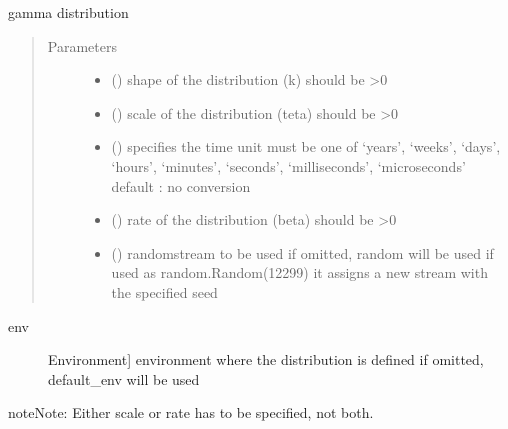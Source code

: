 \documentclass[letterpaper,10pt,english]{sphinxmanual}
\begin{document}
\begin{fulllineitems}
\label{\detokenize{Reference:salabim.Gamma}}
gamma distribution
\begin{quote}\begin{description}
\item[{Parameters}] \leavevmode\begin{itemize}
\item {} 
 () \textendash{} shape of the distribution (k) 
should be \textgreater{}0

\item {} 
 () \textendash{} scale of the distribution (teta) 
should be \textgreater{}0

\item {} 
 () \textendash{} specifies the time unit 
must be one of ‘years’, ‘weeks’, ‘days’, ‘hours’, ‘minutes’, ‘seconds’, ‘milliseconds’, ‘microseconds’ 
default : no conversion 

\item {} 
 () \textendash{} rate of the distribution (beta) 
should be \textgreater{}0

\item {} 
 () \textendash{} randomstream to be used 
if omitted, random will be used 
if used as random.Random(12299)
it assigns a new stream with the specified seed

\end{itemize}

\end{description}\end{quote}
\begin{description}
\item[{env}] \leavevmode{[}Environment{]}
environment where the distribution is defined 
if omitted, default\_env will be used

\end{description}

\begin{sphinxadmonition}{note}{Note:}
Either scale or rate has to be specified, not both.
\end{sphinxadmonition}


\end{fulllineitems}
\end{document}
